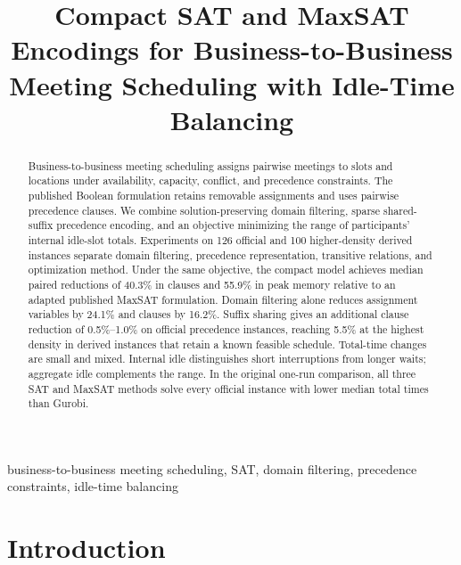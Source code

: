 \documentclass[conference,a4paper]{IEEEtran}
\newcommand{\revised}[1]{#1}
\begin{document}
\title{Compact SAT and MaxSAT Encodings for Business-to-Business Meeting Scheduling with Idle-Time Balancing}

\author{
 }

\maketitle

\begin{abstract}
\revised{Business-to-business meeting scheduling assigns pairwise meetings to slots and locations under availability, capacity, conflict, and precedence constraints. The published Boolean formulation retains removable assignments and uses pairwise precedence clauses. We combine solution-preserving domain filtering, sparse shared-suffix precedence encoding, and an objective minimizing the range of participants' internal idle-slot totals. Experiments on 126 official and 100 higher-density derived instances separate domain filtering, precedence representation, transitive relations, and optimization method. Under the same objective, the compact model achieves median paired reductions of 40.3\% in clauses and 55.9\% in peak memory relative to an adapted published MaxSAT formulation. Domain filtering alone reduces assignment variables by 24.1\% and clauses by 16.2\%. Suffix sharing gives an additional clause reduction of 0.5\%--1.0\% on official precedence instances, reaching 5.5\% at the highest density in derived instances that retain a known feasible schedule. Total-time changes are small and mixed. Internal idle distinguishes short interruptions from longer waits; aggregate idle complements the range. In the original one-run comparison, all three SAT and MaxSAT methods solve every official instance with lower median total times than Gurobi.}
\end{abstract}

\begin{IEEEkeywords}
business-to-business meeting scheduling, SAT, domain filtering, precedence constraints, idle-time balancing
\end{IEEEkeywords}

\section{Introduction}
\label{sec:introduction}
\end{document}
